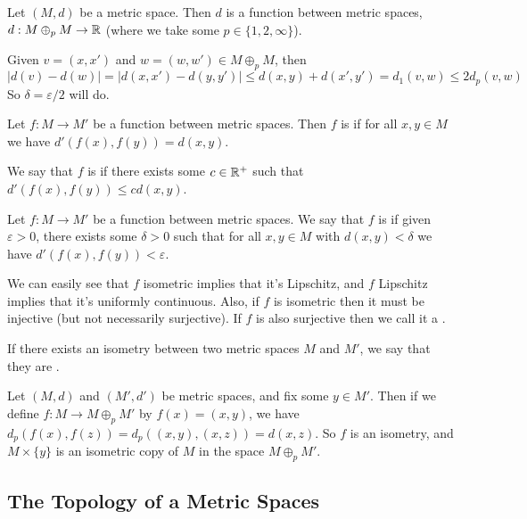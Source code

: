 \documentclass[a4paper]{scrartcl}
\begin{document}
\begin{example}
    Let $(M, d)$ be a metric space. Then $d$ is a function between metric spaces, $d: M \oplus_p M \rightarrow \mathbb{R}$ (where we take some $p \in \{1, 2, \infty\}$).

    Given $v = (x, x')$ and $w = (w, w') \in M \oplus_p M$, then 
    $$|d(v) - d(w)| = |d(x, x') - d(y, y')| \leq d(x, y) + d(x', y') = d_1(v, w) \leq 2d_p(v, w)$$
    So $\delta = \varepsilon/2$ will do.
\end{example}

\begin{definition}
    Let $f: M \rightarrow M'$ be a function between metric spaces. Then $f$ is  if for all $x, y \in M$ we have $d'(f(x), f(y)) = d(x, y)$.

    We say that $f$ is  if there exists some $c \in \mathbb{R}^+$ such that $d'(f(x), f(y)) \leq cd(x, y)$.
\end{definition}

\begin{definition}
    Let $f: M \rightarrow M'$ be a function between metric spaces. We say that $f$ is  if given $\varepsilon > 0$, there exists some $\delta > 0$ such that for all $x, y \in M$ with $d(x, y) < \delta$ we have $d'(f(x), f(y)) < \varepsilon$. 
\end{definition}

We can easily see that $f$ isometric implies that it's Lipschitz, and $f$ Lipschitz implies that it's uniformly continuous. Also, if $f$ is isometric then it must be injective (but not necessarily surjective). If $f$ is also surjective then we call it a .

If there exists an isometry between two metric spaces $M$ and $M'$, we say that they are .

\begin{example}
    Let $(M,d)$ and $(M', d')$ be metric spaces, and fix some $y \in M'$. Then if we define $f: M \rightarrow M \oplus_p M'$ by $f(x) = (x, y)$, we have $d_p(f(x), f(z)) = d_p((x, y), (x, z)) = d(x, z)$. So $f$ is an isometry, and $M \times \{y\}$ is an isometric copy of $M$ in the space $M \oplus_p M'$. 
\end{example}

\subsection{The Topology of a Metric Spaces}
\end{document}
